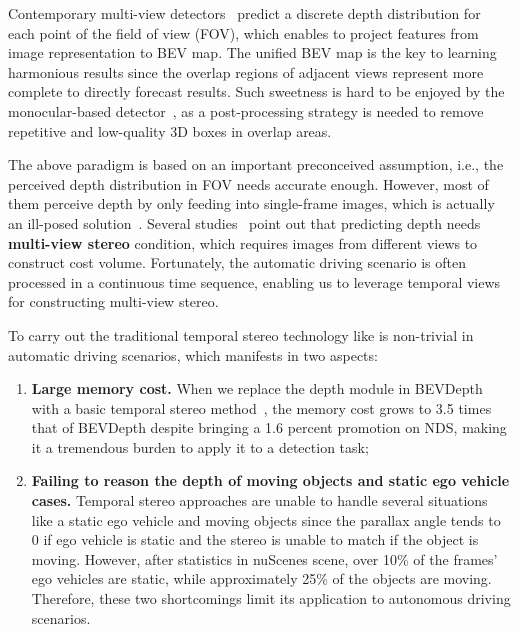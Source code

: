 \documentclass[letterpaper]{article} \usepackage[]{aaai23}  \usepackage{times}  \usepackage{helvet}  \usepackage{courier}  \usepackage[hyphens]{url}  \usepackage{graphicx} \urlstyle{rm} \def\UrlFont{\rm}  \usepackage{natbib}  \usepackage{caption} \frenchspacing  \setlength{\pdfpagewidth}{8.5in} \setlength{\pdfpageheight}{11in} \usepackage{algorithm}
\begin{document}
Contemporary multi-view detectors~\cite{huang2021bevdet, huang2022bevdet4d, li2022bevdepth} predict a discrete depth distribution for each point of the field of view (FOV), which enables to project features from image representation to BEV map. The unified BEV map is the key to learning harmonious results since the overlap regions of adjacent views represent more complete to directly forecast results. Such sweetness is hard to be enjoyed by the monocular-based detector~\cite{wang2021fcos3d}, as a post-processing strategy is needed to remove repetitive and low-quality 3D boxes in overlap areas. 



The above paradigm is based on an important preconceived assumption, i.e., the perceived depth distribution in FOV needs accurate enough. However, most of them perceive depth by only feeding into single-frame images, which is actually an ill-posed solution~\cite{huang2021bevdet, huang2022bevdet4d, li2022bevdepth}. Several studies~\cite{yao2018mvsnet, xue2019mvscrf, bae2022multi} point out that predicting depth needs \textbf{multi-view stereo} condition, which requires images from different views to construct cost volume. Fortunately, the automatic driving scenario is often processed in a continuous time sequence, enabling us to leverage temporal views for constructing multi-view stereo. 

To carry out the traditional temporal stereo technology like \cite{yao2018mvsnet} is non-trivial in automatic driving scenarios, which manifests in two aspects:





\begin{enumerate}
\item \textbf{Large memory cost.} When we replace the depth module in BEVDepth with a basic temporal stereo method~\cite{yao2018mvsnet}, the memory cost grows to 3.5 times that of BEVDepth despite bringing a 1.6 percent promotion on NDS, making it a tremendous burden to apply it to a detection task;

\item \textbf{Failing to reason the depth of moving objects and static ego vehicle cases.} Temporal stereo approaches are unable to handle several situations~\cite{wang2022monocular} like a static ego vehicle and moving objects since the parallax angle tends to 0 if ego vehicle is static and the stereo is unable to match if the object is moving. However, after statistics in nuScenes scene, over 10\% of the frames' ego vehicles are static, while approximately 25\% of the objects are moving. Therefore, these two shortcomings limit its application to autonomous driving scenarios.
\end{enumerate} 
\end{document}
